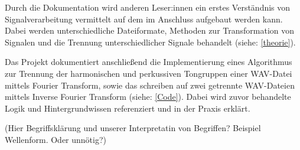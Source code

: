 \par

Durch die Dokumentation wird anderen Leser:innen ein erstes Verständnis von Signalverarbeitung vermittelt auf dem im Anschluss aufgebaut werden kann. Dabei werden unterschiedliche Dateiformate, Methoden zur Transformation von Signalen und die Trennung unterschiedlicher Signale behandelt (siehe: \cref{theorie}).

\par

Das Projekt dokumentiert anschließend die Implementierung eines Algorithmus zur Trennung der harmonischen und perkussiven Tongruppen einer WAV-Datei mittels Fourier Transform, sowie das schreiben auf zwei getrennte WAV-Dateien mittels Inverse Fourier Transform (siehe: \cref{Code}). Dabei wird zuvor behandelte Logik und Hintergrundwissen referenziert und in der Praxis erklärt.

(Hier Begriffsklärung und unserer Interpretatin von Begriffen? Beispiel Wellenform. Oder unnötig?)